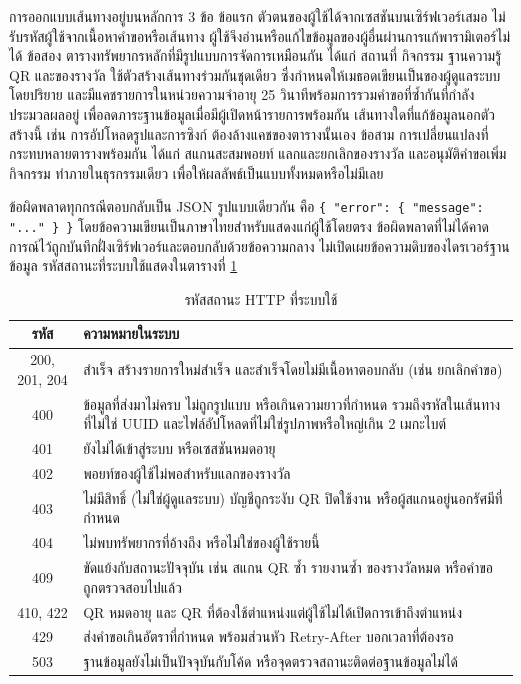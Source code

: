 การออกแบบเส้นทางอยู่บนหลักการ 3 ข้อ ข้อแรก ตัวตนของผู้ใช้ได้จากเซสชันบนเซิร์ฟเวอร์เสมอ ไม่รับรหัสผู้ใช้จากเนื้อหาคำขอหรือเส้นทาง ผู้ใช้จึงอ่านหรือแก้ไขข้อมูลของผู้อื่นผ่านการแก้พารามิเตอร์ไม่ได้ ข้อสอง ตารางทรัพยากรหลักที่มีรูปแบบการจัดการเหมือนกัน ได้แก่ สถานที่ กิจกรรม ฐานความรู้ QR และของรางวัล ใช้ตัวสร้างเส้นทางร่วมกันชุดเดียว ซึ่งกำหนดให้เมธอดเขียนเป็นของผู้ดูแลระบบโดยปริยาย และมีแคชรายการในหน่วยความจำอายุ 25 วินาทีพร้อมการรวมคำขอที่ซ้ำกันที่กำลังประมวลผลอยู่ เพื่อลดภาระฐานข้อมูลเมื่อมีผู้เปิดหน้ารายการพร้อมกัน เส้นทางใดที่แก้ข้อมูลนอกตัวสร้างนี้ เช่น การอัปโหลดรูปและการซิงก์ ต้องล้างแคชของตารางนั้นเอง ข้อสาม การเปลี่ยนแปลงที่กระทบหลายตารางพร้อมกัน ได้แก่ สแกนสะสมพอยท์ แลกและยกเลิกของรางวัล และอนุมัติคำขอเพิ่มกิจกรรม ทำภายในธุรกรรมเดียว เพื่อให้ผลลัพธ์เป็นแบบทั้งหมดหรือไม่มีเลย

ข้อผิดพลาดทุกกรณีตอบกลับเป็น JSON รูปแบบเดียวกัน คือ \texttt{\{ "error": \{ "message": "..." \} \}} โดยข้อความเขียนเป็นภาษาไทยสำหรับแสดงแก่ผู้ใช้โดยตรง ข้อผิดพลาดที่ไม่ได้คาดการณ์ไว้ถูกบันทึกฝั่งเซิร์ฟเวอร์และตอบกลับด้วยข้อความกลาง ไม่เปิดเผยข้อความดิบของไดรเวอร์ฐานข้อมูล รหัสสถานะที่ระบบใช้แสดงในตารางที่ \ref{tab:http_status}

\begin{table}[H]
\centering
\caption{รหัสสถานะ HTTP ที่ระบบใช้}
\label{tab:http_status}
\begin{tabular}{|c|p{11.5cm}|}
\hline
\textbf{รหัส} & \textbf{ความหมายในระบบ} \\
\hline
200, 201, 204 & สำเร็จ สร้างรายการใหม่สำเร็จ และสำเร็จโดยไม่มีเนื้อหาตอบกลับ (เช่น ยกเลิกคำขอ) \\ \hline
400 & ข้อมูลที่ส่งมาไม่ครบ ไม่ถูกรูปแบบ หรือเกินความยาวที่กำหนด รวมถึงรหัสในเส้นทางที่ไม่ใช่ UUID และไฟล์อัปโหลดที่ไม่ใช่รูปภาพหรือใหญ่เกิน 2 เมกะไบต์ \\ \hline
401 & ยังไม่ได้เข้าสู่ระบบ หรือเซสชันหมดอายุ \\ \hline
402 & พอยท์ของผู้ใช้ไม่พอสำหรับแลกของรางวัล \\ \hline
403 & ไม่มีสิทธิ์ (ไม่ใช่ผู้ดูแลระบบ) บัญชีถูกระงับ QR ปิดใช้งาน หรือผู้สแกนอยู่นอกรัศมีที่กำหนด \\ \hline
404 & ไม่พบทรัพยากรที่อ้างถึง หรือไม่ใช่ของผู้ใช้รายนี้ \\ \hline
409 & ขัดแย้งกับสถานะปัจจุบัน เช่น สแกน QR ซ้ำ รายงานซ้ำ ของรางวัลหมด หรือคำขอถูกตรวจสอบไปแล้ว \\ \hline
410, 422 & QR หมดอายุ และ QR ที่ต้องใช้ตำแหน่งแต่ผู้ใช้ไม่ได้เปิดการเข้าถึงตำแหน่ง \\ \hline
429 & ส่งคำขอเกินอัตราที่กำหนด พร้อมส่วนหัว Retry-After บอกเวลาที่ต้องรอ \\ \hline
503 & ฐานข้อมูลยังไม่เป็นปัจจุบันกับโค้ด หรือจุดตรวจสถานะติดต่อฐานข้อมูลไม่ได้ \\
\hline
\end{tabular}
\end{table}

